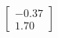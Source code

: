 \documentclass[preview]{standalone}
\begin{document}
\begin{align*}
\begin{bmatrix} -0.37 \\ 1.70 \end{bmatrix}
\end{align*}
\end{document}
